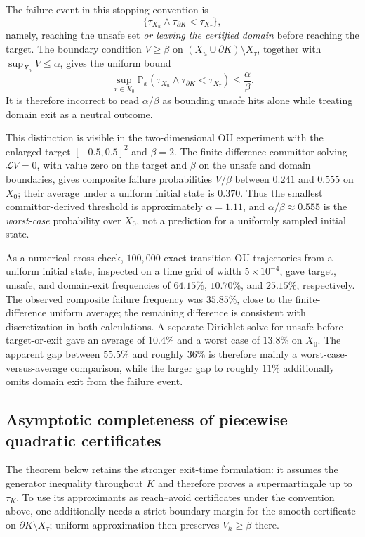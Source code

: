 The failure event in this stopping convention is
\[
  \{\tau_{X_u}\wedge\tau_{\partial K}<\tau_{X_\tau}\},
\]
namely, reaching the unsafe set \emph{or leaving the certified domain} before
reaching the target.  The boundary condition
$V\geq\beta$ on $(X_u\cup\partial K)\setminus X_\tau$, together with
$\sup_{X_0}V\leq\alpha$, gives the uniform bound
\[
  \sup_{x\in X_0}
  \mathbb P_x\!\left(
    \tau_{X_u}\wedge\tau_{\partial K}<\tau_{X_\tau}
  \right)
  \leq \frac{\alpha}{\beta}.
\]
It is therefore incorrect to read $\alpha/\beta$ as bounding unsafe hits
alone while treating domain exit as a neutral outcome.

This distinction is visible in the two-dimensional OU experiment with the
enlarged target $[-0.5,0.5]^2$ and $\beta=2$.  The finite-difference
committor solving $\mathcal LV=0$, with value zero on the target and $\beta$
on the unsafe and domain boundaries, gives composite failure probabilities
$V/\beta$ between $0.241$ and $0.555$ on $X_0$; their average under a uniform
initial state is $0.370$.  Thus the smallest committor-derived threshold is
approximately $\alpha=1.11$, and $\alpha/\beta\approx0.555$ is the
\emph{worst-case} probability over $X_0$, not a prediction for a uniformly
sampled initial state.

As a numerical cross-check, $100{,}000$ exact-transition OU trajectories from
a uniform initial state, inspected on a time grid of width $5\times10^{-4}$,
gave target, unsafe, and domain-exit frequencies of $64.15\%$, $10.70\%$, and
$25.15\%$, respectively.  The observed composite failure frequency was
$35.85\%$, close to the finite-difference uniform average; the remaining
difference is consistent with discretization in both calculations.  A
separate Dirichlet solve for unsafe-before-target-or-exit gave an average of
$10.4\%$ and a worst case of $13.8\%$ on $X_0$.  The apparent gap between
$55.5\%$ and roughly $36\%$ is therefore mainly a worst-case-versus-average
comparison, while the larger gap to roughly $11\%$ additionally omits domain
exit from the failure event.

\subsection{Asymptotic completeness of piecewise quadratic certificates}

The theorem below retains the stronger exit-time formulation: it assumes the
generator inequality throughout $K$ and therefore proves a supermartingale up
to $\tau_K$.  To use its approximants as reach--avoid certificates under the
convention above, one additionally needs a strict boundary margin for the
smooth certificate on $\partial K\setminus X_\tau$; uniform approximation then
preserves $V_h\geq\beta$ there.

